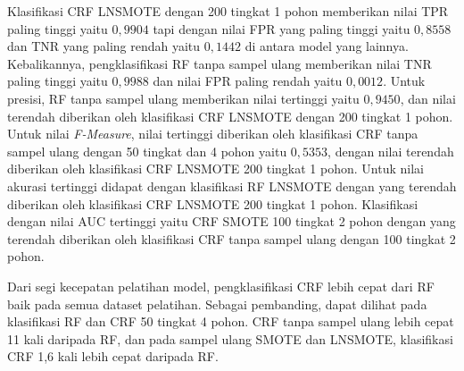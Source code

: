 Klasifikasi CRF LNSMOTE dengan 200 tingkat 1 pohon memberikan nilai TPR paling
tinggi yaitu $0,9904$ tapi dengan nilai FPR yang paling tinggi yaitu $0,8558$
dan TNR yang paling rendah yaitu $0,1442$ di antara model yang lainnya.
Kebalikannya, pengklasifikasi RF tanpa sampel ulang memberikan nilai TNR paling
tinggi yaitu $0,9988$ dan nilai FPR paling rendah yaitu $0,0012$.
Untuk presisi, RF tanpa sampel ulang memberikan nilai tertinggi yaitu $0,9450$,
dan nilai terendah diberikan oleh klasifikasi CRF LNSMOTE dengan 200 tingkat 1
pohon.
Untuk nilai \textit{F-Measure}, nilai tertinggi diberikan oleh klasifikasi CRF
tanpa sampel ulang dengan 50 tingkat dan 4 pohon yaitu $0,5353$, dengan nilai
terendah diberikan oleh klasifikasi CRF LNSMOTE 200 tingkat 1 pohon.
Untuk nilai akurasi tertinggi didapat dengan klasifikasi RF LNSMOTE dengan
yang terendah diberikan oleh klasifikasi CRF LNSMOTE 200 tingkat 1 pohon.
Klasifikasi dengan nilai AUC tertinggi yaitu CRF SMOTE 100 tingkat 2 pohon
dengan yang terendah diberikan oleh klasifikasi CRF tanpa sampel ulang dengan
100 tingkat 2 pohon.

Dari segi kecepatan pelatihan model, pengklasifikasi CRF lebih cepat dari RF
baik pada semua dataset pelatihan.
Sebagai pembanding, dapat dilihat pada klasifikasi RF dan CRF 50 tingkat 4
pohon.
CRF tanpa sampel ulang lebih cepat 11 kali daripada RF, dan pada sampel ulang
SMOTE dan LNSMOTE, klasifikasi CRF 1,6 kali lebih cepat daripada RF.
